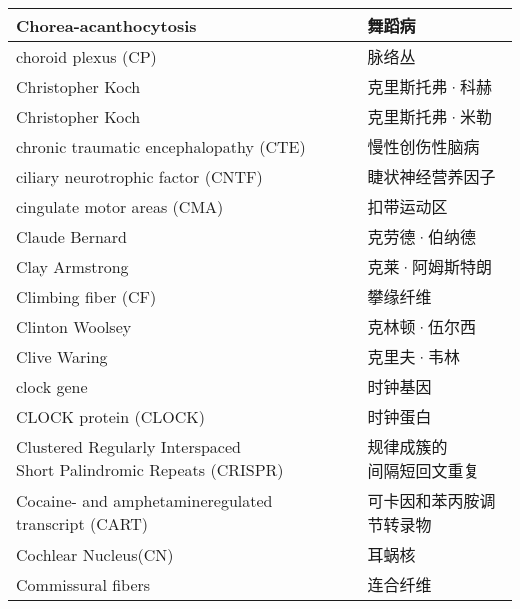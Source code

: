 \begin{longtable}{lll}
	\midrule
	Chorea-acanthocytosis   && 舞蹈病  \\
	
	\midrule
	choroid plexus (CP)   && 脉络丛  \\
	
	\midrule
	Christopher Koch   && 克里斯托弗·科赫  \\
	
	\midrule
	Christopher Koch   && 克里斯托弗·米勒  \\
	
	\midrule
	chronic traumatic encephalopathy (CTE)   && 慢性创伤性脑病  \\
	
	\midrule
	ciliary neurotrophic factor (CNTF)  && 睫状神经营养因子  \\
	
	\midrule
	cingulate motor areas (CMA)   && 扣带运动区  \\
	
	\midrule
	Claude Bernard   && 克劳德·伯纳德  \\
	
	\midrule
	Clay Armstrong   && 克莱·阿姆斯特朗  \\
	
	\midrule
	Climbing fiber (CF)  && 攀缘纤维  \\
	
	\midrule
	Clinton Woolsey  && 克林顿·伍尔西  \\
	
	\midrule
	Clive Waring   && 克里夫·韦林  \\
	
	\midrule
	clock gene   && 时钟基因  \\
	
	\midrule
	CLOCK protein (CLOCK)  && 时钟蛋白  \\
	
	\midrule
	\makecell[l]{Clustered Regularly Interspaced\\ Short Palindromic Repeats (CRISPR)}  && \makecell[l]{规律成簇的\\间隔短回文重复}  \\
	
	\midrule
	Cocaine- and amphetamineregulated transcript (CART)   && 可卡因和苯丙胺调节转录物  \\
	
	\midrule
	Cochlear Nucleus(CN)   && 耳蜗核  \\
	
	\midrule
	Commissural fibers   && 连合纤维  \\
	

\end{longtable}
